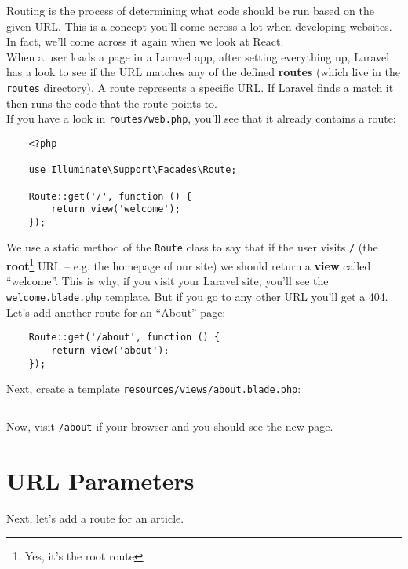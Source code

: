 Routing is the process of determining what code should be run based on the given URL. This is a concept you'll come across a lot when developing websites. In fact, we'll come across it again when we look at React.
\\

When a user loads a page in a Laravel app, after setting everything up, Laravel has a look to see if the URL matches any of the defined \textbf{routes} (which live in the \texttt{routes} directory). A route represents a specific URL. If Laravel finds a match it then runs the code that the route points to.
\\

If you have a look in \texttt{routes/web.php}, you'll see that it already contains a route:

\begin{verbatim}
    <?php

    use Illuminate\Support\Facades\Route;

    Route::get('/', function () {
        return view('welcome');
    });
\end{verbatim}

We use a static method of the \texttt{Route} class to say that if the user visits \texttt{/} (the \textbf{root}\footnote{Yes, it's the root route} URL – e.g. the homepage of our site) we should return a \textbf{view} called ``welcome''. This is why, if you visit your Laravel site, you'll see the \texttt{welcome.blade.php} template. But if you go to any other URL you'll get a 404.
\\

Let's add another route for an ``About'' page:

\begin{verbatim}
    Route::get('/about', function () {
        return view('about');
    });
\end{verbatim}

Next, create a template \texttt{resources/views/about.blade.php}:

\inputminted{html}{08-routing/figures/01-about.blade.php}

Now, visit \texttt{/about} if your browser and you should see the new page.



\section{URL Parameters}

Next, let's add a route for an article.
\\


